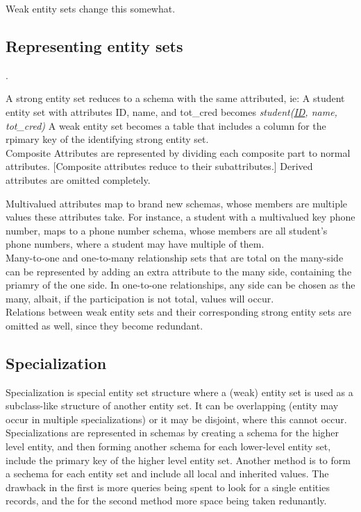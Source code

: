 \documentclass[11pt,a4paper,twocolumn]{book}
\begin{document}
Weak entity sets change this somewhat.

\subsection{Representing entity sets}.

A strong entity set reduces to a schema with the same attributed, ie: A student entity set with attributes ID, name, and tot\_cred becomes \textit{student(\underline{ID}, name, tot\_cred)} A weak entity set becomes a table that includes a column for the rpimary key of the identifying strong entity set.\\

Composite Attributes are represented by dividing each composite part to normal attributes. [Composite attributes reduce to their subattributes.] Derived attributes are omitted completely.

Multivalued attributes map to brand new schemas, whose members are multiple values these attributes take. For instance, a student with a multivalued key phone number, maps to a phone number schema, whose members are all student's phone numbers, where a student may have multiple of them.\\


Many-to-one and one-to-many relationship sets that are total on the many-side can be represented by adding an extra attribute to the many side, containing the priamry of the one side. In one-to-one relationships, any side can be chosen as the many, albait, if the participation is not total,  values will occur.\\

Relations between weak entity sets and their corresponding strong entity sets are omitted as well, since they become redundant.

\subsection{Specialization}

Specialization is special entity set structure where a (weak) entity set is used as a subclass-like structure of another entity set. It can be overlapping (entity may occur in multiple specializations) or it may be disjoint, where this cannot occur.\\

Specializations are represented in schemas by creating a schema for the higher level entity, and then forming another schema for each lower-level entity set, include the primary key of the higher level entity set. Another method is to form a sechema for each entity set and include all local and inherited values. The drawback in the first is more queries being spent to look for a single entities records, and the for the second method more space being taken redunantly.\\
\end{document}
